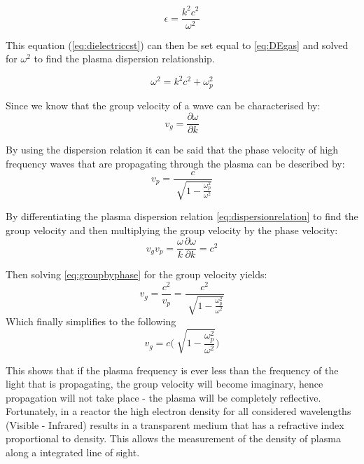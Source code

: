 \documentclass[12pt,a4paper,oneside]{report}
\begin{document}
\begin{equation}
\epsilon = \frac{k^{2}c^{2}}{\omega ^{2}}
	\label{eq:dielectriccst}
\end{equation}

This equation (\ref{eq:dielectriccst}) can then be set equal to \ref{eq:DEgas} and solved for $\omega ^{2}$ to find the plasma dispersion relationship.

\begin{equation}
\omega ^{2} = k^{2}c^{2} + \omega _{p}^{2}
	\label{eq:dispersionrelation}
\end{equation}

Since we know that the group velocity of a wave can be characterised by:
\begin{equation}
v_{g} = \frac{\partial \omega}{\partial k}
	\label{eq:groupvelocity}
\end{equation}

By using the dispersion relation it can be said that the phase velocity of high frequency waves that are propagating through the plasma can be described by:
\begin{equation}
v_{p} = \frac{c}{\sqrt[]{1-\frac{\omega _{p}^{2}}{\omega ^{2}}}}
	\label{eq:highfreqprop}
\end{equation}

By differentiating the plasma dispersion relation \ref{eq:dispersionrelation} to find the group velocity and then multiplying the group velocity by the phase velocity:
\begin{equation}
v_{g} v_{p} = \frac{\omega}{k} \frac{\partial \omega}{\partial k} = c^{2}
	\label{eq:groupbyphase}
\end{equation}

Then solving \ref{eq:groupbyphase} for the group velocity yields:
\begin{equation}
v_{g} = \frac{c^{2}}{v_{p}} = \frac{c^{2}}{\sqrt[]{1-\frac{\omega _{p}^{2}}{\omega ^{2}}}}
	\label{eq:groupvelocityplasma}
\end{equation}
Which finally simplifies to the following
\begin{equation}
v_{g} = c \Big(\sqrt[]{1-\frac{\omega _{p}^{2}}{\omega ^{2}}} \Big)
	\label{eq:groupvelocityplasma}
\end{equation}

This shows that if the plasma frequency is ever less than the frequency of the light that is propagating, the group velocity will become imaginary, hence propagation will not take place - the plasma will be completely reflective. Fortunately, in a reactor the high electron density for all considered wavelengths (Visible - Infrared) results in a transparent medium that has a refractive index proportional to density. This allows the measurement of the density of plasma along a integrated line of sight.\\
\end{document}
